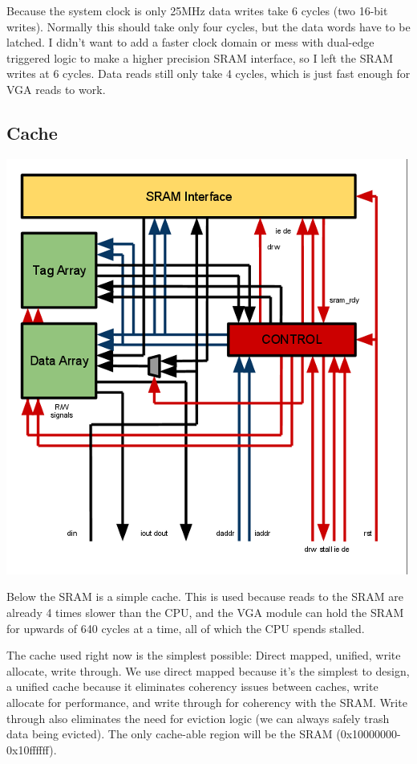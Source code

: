 \documentclass{article}
\begin{document}
Because the system clock is only 25MHz data writes take 6 cycles (two 16-bit writes). Normally this should take only four cycles, but the data words have to be latched. I didn't want to add a faster clock domain or mess with dual-edge triggered logic to make a higher precision SRAM interface, so I left the SRAM writes at 6 cycles. Data reads still only take 4 cycles, which is just fast enough for VGA reads to work.

\subsection{Cache}

\includegraphics[scale=0.6]{../../images/CACHE.png} 

Below the SRAM is a simple cache. This is used because reads to the SRAM are already 4 times slower than the CPU, and the VGA module can hold the SRAM for upwards of 640 cycles at a time, all of which the CPU spends stalled.

The cache used right now is the simplest possible: Direct mapped, unified, write allocate, write through. We use direct mapped because it's the simplest to design, a unified cache because it eliminates coherency issues between caches, write allocate for performance, and write through for coherency with the SRAM. Write through also eliminates the need for eviction logic (we can always safely trash data being evicted). The only cache-able region will be the SRAM (0x10000000-0x10ffffff).
\end{document}
